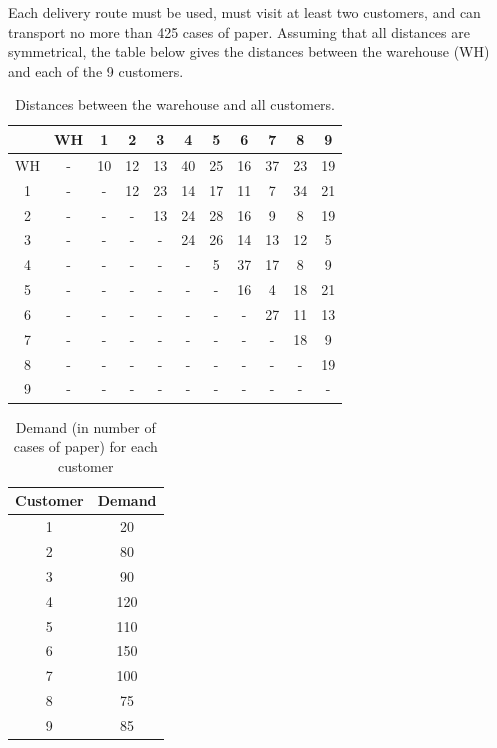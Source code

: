 \documentclass[12pt]{exam}
\begin{document}
\begin{questions}
Each delivery route must be used, must visit at least two customers, and can transport no more than 425 cases of paper. Assuming that all distances are symmetrical, the table below gives the distances between the warehouse (WH) and each of the 9 customers.

\begin{table}[h]
\caption{Distances between the warehouse and all customers.}
\begin{center}
\begin{tabular}{|c|c|c|c|c|c|c|c|c|c|c|}
\hline
& WH &1&2&3&4&5&6&7&8&9\\ \hline
WH & - &10&12&13&40&25&16&37&23&19 \\ \hline
1& -  & - & 12 & 23 & 14 & 17 & 11 & 7 & 34 & 21 \\ \hline
2& -  & -  & - & 13 & 24 & 28 & 16 & 9 & 8 & 19 \\ \hline
3& -  & -  & -  & - & 24 & 26 & 14 & 13 & 12  & 5 \\ \hline
4& -  & -  & -  & -  & - & 5 & 37 & 17 & 8 & 9 \\ \hline
5&-  & -  & -  & -  & -  & - & 16 & 4 & 18 &  21 \\ \hline
6& -  & -  & -  &-  & -  & -  & - & 27 & 11 &  13 \\ \hline
7& -  & -  & -  & -  & -  & -  & -  & - & 18 & 9 \\ \hline
8& -  & -  & -  & -  &-  & -  &-  & -  & - & 19 \\ \hline
9& -  & -  & -  &-  & -  & -  & -  & -  & -   &- \\ \hline
\end{tabular}

\end{center}
\end{table}

\begin{table}[h]
\caption{Demand (in number of cases of paper) for each customer}
\begin{center}
\begin{tabular}{|c|c|}
\hline
Customer&Demand\\ \hline
1 & 20  \\ \hline
2 & 80  \\ \hline
3 & 90 \\ \hline
4 &  120\\ \hline
5 & 110 \\ \hline
6&  150\\ \hline
7& 100  \\ \hline
8& 75 \\ \hline
9& 85 \\ \hline
\end{tabular}


\end{center}
\end{table}
\end{questions}
\end{document}
